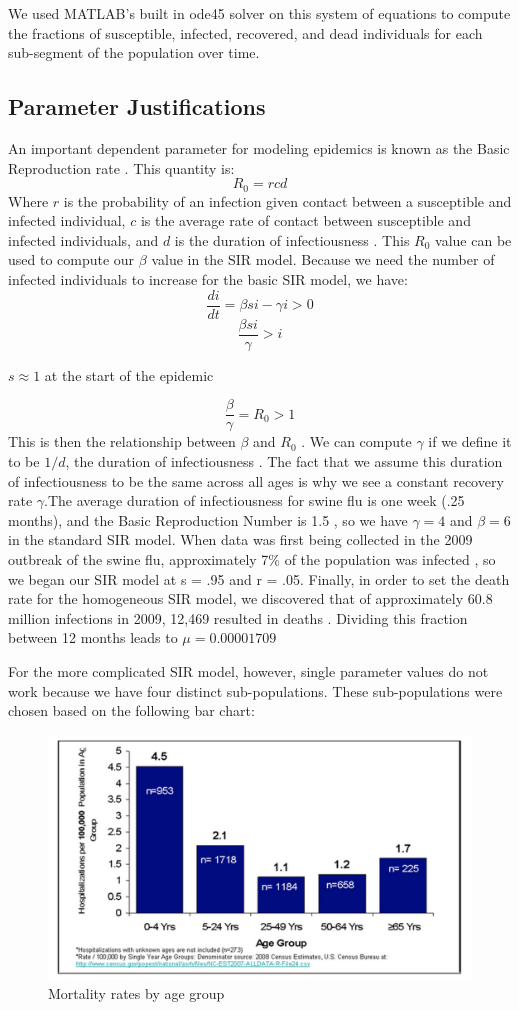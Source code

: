 \documentclass[titlepage]{article}
\begin{document}
	We used MATLAB's built in ode45 solver on this system of equations to compute the fractions of susceptible, infected, recovered, and dead individuals for each sub-segment of the population over time.
\subsection{Parameter Justifications}
	An important dependent parameter for modeling epidemics is known as the Basic Reproduction rate \cite{SIR}. This quantity is:
	\[
		R_0 = r c d
	\]
	Where $r$ is the probability of an infection given contact between a susceptible and infected individual, $c$ is the average rate of contact between susceptible and infected individuals, and $d$ is the duration of infectiousness \cite{SIR}. This $R_0$ value can be used to compute our $\beta$ value in the SIR model. Because we need the number of infected individuals to increase for the basic SIR model, we have:
	\[
		\frac{di}{dt} = \beta s i - \gamma i > 0
	\]
	\[
		\frac{\beta s i}{\gamma} > i
	\]
	\begin{center}
		$s \approx 1$ at the start of the epidemic
	\end{center}
	\[
		\frac{\beta}{\gamma} = R_0 > 1
	\]
	This is then the relationship between $\beta$ and $R_0$ \cite{SIR}. We can compute $\gamma$ if we define it to be $1/d$, the duration of infectiousness \cite{SIR}. The fact that we assume this duration of infectiousness to be the same across all ages is why we see a constant recovery rate $\gamma$.The average duration of infectiousness for swine flu is one week \cite{oneweek}(.25 months), and the Basic Reproduction Number is 1.5 \cite{R0}, so we have $\gamma = 4$ and $\beta = 6$ in the standard SIR model. When data was first being collected in the 2009 outbreak of the swine flu, approximately 7\% of the population was infected \cite{init}, so we began our SIR model at s = .95 and r = .05. Finally, in order to set the death rate for the homogeneous SIR model, we discovered that of approximately 60.8 million infections in 2009, 12,469 resulted in deaths \cite{deathpercent}. Dividing this fraction between 12 months leads to $\mu = 0.00001709$

    For the more complicated SIR model, however, single parameter values do not work because we have four distinct sub-populations. These sub-populations were chosen based on the following bar chart:

	\begin{figure}[h!]
	\centering
		\includegraphics[width=.5\textwidth]{figures/death_graph.png}
        \caption{Mortality rates by age group \cite{deathgraph}}
	\end{figure}
\end{document}
